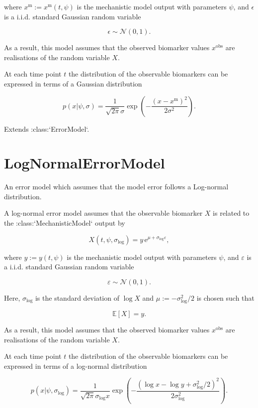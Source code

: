 \documentclass{article}
\begin{document}
    where $x^{\text{m}} := x^{\text{m}}(t, \psi )$ is the mechanistic
    model output with parameters $\psi$, and $\epsilon$ is a
    i.i.d. standard Gaussian random variable

    $$
        \epsilon \sim \mathcal{N}(0, 1).
    $$

    As a result, this model assumes that the observed biomarker values
    $x^{\text{obs}}$ are realisations of the random variable
    $X$.

    At each time point $t$ the distribution of the observable biomarkers
    can be expressed in terms of a Gaussian distribution

    $$
        p(x | \psi , \sigma ) =
        \frac{1}{\sqrt{2\pi} \sigma }
        \exp{\left(-\frac{\left(x-x^{\text{m}}\right) ^2}
        {2\sigma^2 } \right)}.
    $$

    Extends :class:`ErrorModel`.


\section{LogNormalErrorModel}
    An error model which assumes that the model error follows a Log-normal
    distribution.

    A log-normal error model assumes that the observable
    biomarker $X$ is related to the :class:`MechanisticModel`
    output by

    $$
        X(t, \psi , \sigma _{\mathrm{log}}) =
        y \, \mathrm{e}^{\mu + \sigma _{\mathrm{log}} \varepsilon },
    $$

    where $y := y(t, \psi )$ is the mechanistic
    model output with parameters $\psi$, and $\varepsilon$ is a
    i.i.d. standard Gaussian random variable

    $$
        \varepsilon \sim \mathcal{N}(0, 1).
    $$

    Here, $\sigma _{\mathrm{log}}$ is the standard deviation of
    $\log X$ and
    $\mu := -\sigma _{\mathrm{log}} ^2 / 2$ is chosen such that

    $$
        \mathbb{E}[X] = y.
    $$

    As a result, this model assumes that the observed biomarker values
    $x^{\text{obs}}$ are realisations of the random variable
    $X$.

    At each time point $t$ the distribution of the observable biomarkers
    can be expressed in terms of a log-normal distribution

    $$
        p(x | \psi , \sigma _{\mathrm{log}} ) =
        \frac{1}{\sqrt{2\pi} \sigma _{\mathrm{log}} x}
        \exp{\left(-\frac{
            \left(\log x - \log y + \sigma _{\mathrm{log}}^2/2\right) ^2}
        {2\sigma _{\mathrm{log}}^2 } \right)}.
    $$
\end{document}
